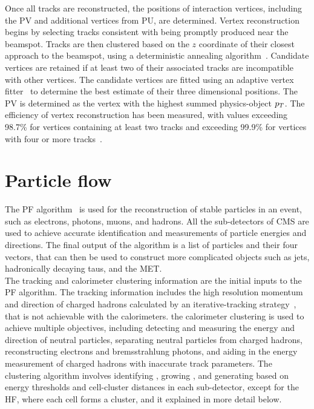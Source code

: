 Once all tracks are reconstructed, the positions of interaction vertices, including the \ac{PV} and additional vertices from \ac{PU}, are determined. 
Vertex reconstruction begins by selecting tracks consistent with being promptly produced near the beamspot. 
Tracks are then clustered based on the $z$ coordinate of their closest approach to the beamspot, using a deterministic annealing algorithm~\cite{Rose:1998dzq}. 
Candidate vertices are retained if at least two of their associated tracks are incompatible with other vertices. 
The candidate vertices are fitted using an adaptive vertex fitter~\cite{Fruhwirth:2007hz} to determine the best estimate of their three dimensional positions. 
The \ac{PV} is determined as the vertex with the highest summed physics-object $p_{T}$.
The efficiency of vertex reconstruction has been measured, with values exceeding 98.7\% for vertices containing at least two tracks and exceeding 99.9\% for vertices with four or more tracks~\cite{CMS:2010mua}. 

\section{Particle flow}

The \ac{PF} algorithm~\cite{PF_CMS,CMS:2010byl,CMS:2010eua} is used for the reconstruction of stable particles in an event, such as electrons, photons, muons, and hadrons. 
All the sub-detectors of \ac{CMS} are used to achieve accurate identification and measurements of particle energies and directions. 
The final output of the algorithm is a list of particles and their four vectors, that can then be used to construct more complicated objects such as jets, hadronically decaying taus, and the \ac{MET}.\\

The tracking and calorimeter clustering information are the initial inputs to the \ac{PF} algorithm.
The tracking information includes the high resolution momentum and direction of charged hadrons calculated by an iterative-tracking strategy~\cite{Adam:934067}, that is not achievable with the calorimeters.
the calorimeter clustering is used to achieve multiple objectives, including detecting and measuring the energy and direction of neutral particles, separating neutral particles from charged hadrons, reconstructing electrons and bremsstrahlung photons, and aiding in the energy measurement of charged hadrons with inaccurate track parameters. 
The clustering algorithm involves identifying , growing , and generating  based on energy thresholds and cell-cluster distances in each sub-detector, except for the \ac{HF}, where each cell forms a cluster, and it explained in more detail below. \\

